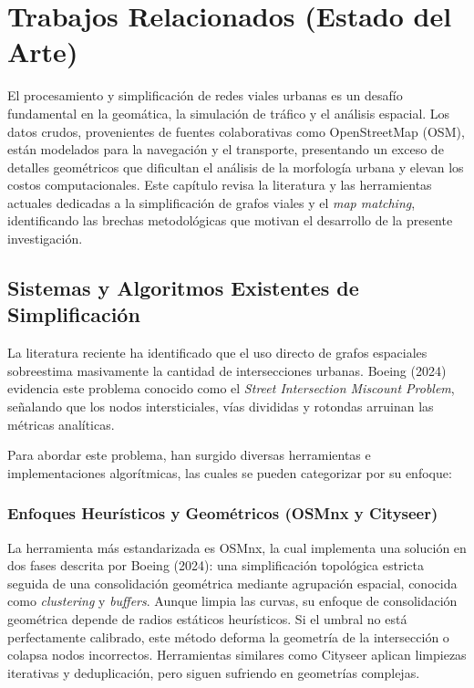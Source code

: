 \chapter{Trabajos Relacionados (Estado del Arte)}

El procesamiento y simplificación de redes viales urbanas es un desafío fundamental en la geomática, la simulación de tráfico y el análisis espacial. Los datos crudos, provenientes de fuentes colaborativas como OpenStreetMap (OSM), están modelados para la navegación y el transporte, presentando un exceso de detalles geométricos que dificultan el análisis de la morfología urbana y elevan los costos computacionales. Este capítulo revisa la literatura y las herramientas actuales dedicadas a la simplificación de grafos viales y el \textit{map matching}, identificando las brechas metodológicas que motivan el desarrollo de la presente investigación.

\section{Sistemas y Algoritmos Existentes de Simplificación}

La literatura reciente ha identificado que el uso directo de grafos espaciales sobreestima masivamente la cantidad de intersecciones urbanas. Boeing (2024) evidencia este problema conocido como el \textit{Street Intersection Miscount Problem}, señalando que los nodos intersticiales, vías divididas y rotondas arruinan las métricas analíticas.

Para abordar este problema, han surgido diversas herramientas e implementaciones algorítmicas, las cuales se pueden categorizar por su enfoque:

\subsection{Enfoques Heurísticos y Geométricos (OSMnx y Cityseer)}
La herramienta más estandarizada es OSMnx, la cual implementa una solución en dos fases descrita por Boeing (2024): una simplificación topológica estricta seguida de una consolidación geométrica mediante agrupación espacial, conocida como \textit{clustering} y \textit{buffers}. Aunque limpia las curvas, su enfoque de consolidación geométrica depende de radios estáticos heurísticos. Si el umbral no está perfectamente calibrado, este método deforma la geometría de la intersección o colapsa nodos incorrectos. Herramientas similares como Cityseer aplican limpiezas iterativas y deduplicación, pero siguen sufriendo en geometrías complejas.

